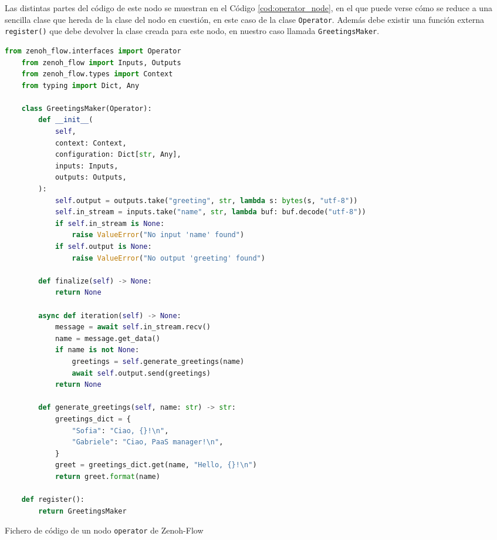 Las distintas partes del código de este nodo se muestran en el Código
\ref{cod:operator_node}, en el que puede verse cómo se reduce a una sencilla
clase que hereda de la clase del nodo en cuestión, en este caso de la clase
\verb|Operator|. Además debe existir una función externa \verb|register()| que
debe devolver la clase creada para este nodo, en nuestro caso llamada
\verb|GreetingsMaker|.
\\

\begin{code}[h!]
  \begin{lstlisting}[language=Python]
    from zenoh_flow.interfaces import Operator
    from zenoh_flow import Inputs, Outputs
    from zenoh_flow.types import Context
    from typing import Dict, Any
    
    class GreetingsMaker(Operator):
        def __init__(
            self,
            context: Context,
            configuration: Dict[str, Any],
            inputs: Inputs,
            outputs: Outputs,
        ):
            self.output = outputs.take("greeting", str, lambda s: bytes(s, "utf-8"))
            self.in_stream = inputs.take("name", str, lambda buf: buf.decode("utf-8"))
            if self.in_stream is None:
                raise ValueError("No input 'name' found")
            if self.output is None:
                raise ValueError("No output 'greeting' found")
    
        def finalize(self) -> None:
            return None
    
        async def iteration(self) -> None:
            message = await self.in_stream.recv()
            name = message.get_data()
            if name is not None:
                greetings = self.generate_greetings(name)
                await self.output.send(greetings)
            return None
    
        def generate_greetings(self, name: str) -> str:
            greetings_dict = {
                "Sofia": "Ciao, {}!\n",
                "Gabriele": "Ciao, PaaS manager!\n",
            }
            greet = greetings_dict.get(name, "Hello, {}!\n")
            return greet.format(name)
    
    def register():
        return GreetingsMaker
  \end{lstlisting}
\caption[Fichero de código de un nodo \texttt{operator} en Zenoh-Flow]{Fichero de código de un nodo \texttt{operator} de Zenoh-Flow}
\label{cod:operator_node}
\end{code}

